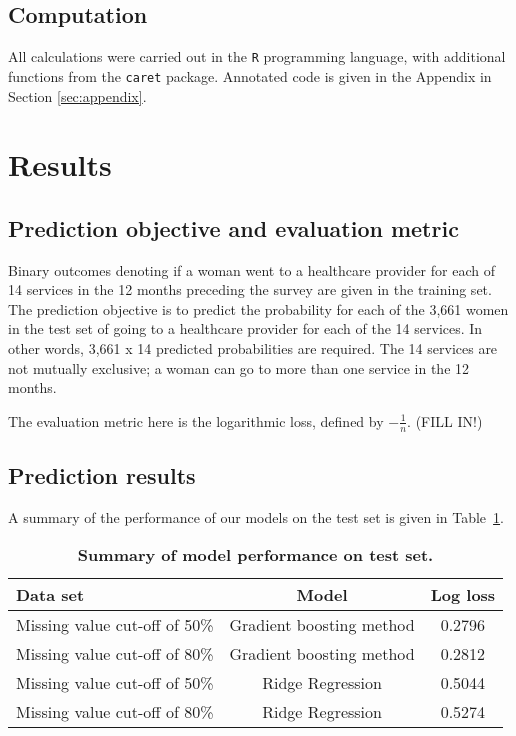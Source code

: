 \documentclass{article}\usepackage[]{graphicx}\usepackage[]{color}
\begin{document}
\subsection{Computation}
All calculations were carried out in the \texttt{R} programming language, with additional functions from the \texttt{caret} package. Annotated code is given in the Appendix in Section \ref{sec:appendix}.
\section{Results} 
\label{sec:results}

\subsection{Prediction objective and evaluation metric}
Binary outcomes denoting if a woman went to a healthcare provider for each of 14 services in the 12 months preceding the survey are given in the training set. The prediction objective is to predict the probability for each of the 3,661 women in the test set of going to a healthcare provider for each of the 14 services. In other words, 3,661 x 14 predicted probabilities are required. The 14 services are not mutually exclusive; a woman can go to more than one service in the 12 months.

The evaluation metric here is the logarithmic loss, defined by $-\frac{1}{n}$. (FILL IN!)

\subsection{Prediction results}
A summary of the performance of our models on the test set is given in Table~\ref{tab-results}.

\begin{table}[ht]
  \centering
  \begin{tabular}{@{}|l|c|c|@{}}
    \hline
  	Data set & Model & Log loss\\ 
		\hline
  	Missing value cut-off of 50\% & Gradient boosting method & 0.2796 \\ 
    Missing value cut-off of 80\% & Gradient boosting method & 0.2812 \\
    Missing value cut-off of 50\% & Ridge Regression & 0.5044 \\
    Missing value cut-off of 80\% & Ridge Regression & 0.5274 \\
  	\hline
	\end{tabular}
	\caption{\textbf{Summary of model performance on test set.}}
  \label{tab-results}
\end{table}
\end{document}
